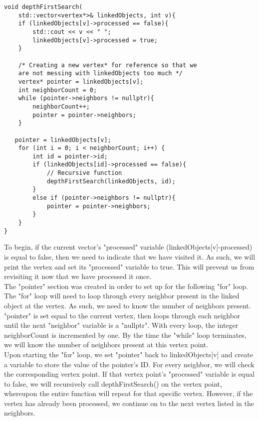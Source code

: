 \documentclass{article}
\begin{document}
\begin{lstlisting}
void depthFirstSearch(
    std::vector<vertex*>& linkedObjects, int v){
    if (linkedObjects[v]->processed == false){
        std::cout << v << " ";
        linkedObjects[v]->processed = true;
    }

    /* Creating a new vertex* for reference so that we 
    are not messing with linkedObjects too much */
    vertex* pointer = linkedObjects[v];
    int neighborCount = 0;
    while (pointer->neighbors != nullptr){
        neighborCount++;
        pointer = pointer->neighbors;
    }

   pointer = linkedObjects[v];
    for (int i = 0; i < neighborCount; i++) {
        int id = pointer->id;
        if (linkedObjects[id]->processed == false){
            // Recursive function
            depthFirstSearch(linkedObjects, id);
        } 
        else if (pointer->neighbors != nullptr){
            pointer = pointer->neighbors;
        }
    }
}
\end{lstlisting}
To begin, if the current vector's "processed" variable (linkedObjects[v]-\>processed) is equal to false, then we need to indicate that we have visited it. As such, we will print the vertex and set its "processed" variable to true. This will prevent us from revisiting it now that we have processed it once. \\
The "pointer" section was created in order to set up for the following "for" loop. The "for" loop will need to loop through every neighbor present in the linked object at the vertex. As such, we need to know the number of neighbors present. "pointer" is set equal to the current vertex, then loops through each neighbor until the next "neighbor" variable is a "nullptr". With every loop, the integer neighborCount is incremented by one. By the time the "while" loop terminates, we will know the number of neighbors present at this vertex point. \\
Upon starting the "for" loop, we set "pointer" back to linkedObjects[v] and create a variable to store the value of the pointer's ID. For every neighbor, we will check the corresponding vertex point. If that vertex point's "processed" variable is equal to false, we will recursively call depthFirstSearch() on the vertex point, whereupon the entire function will repeat for that specific vertex. However, if the vertex has already been processed, we continue on to the next vertex listed in the neighbors. \\
\end{document}
